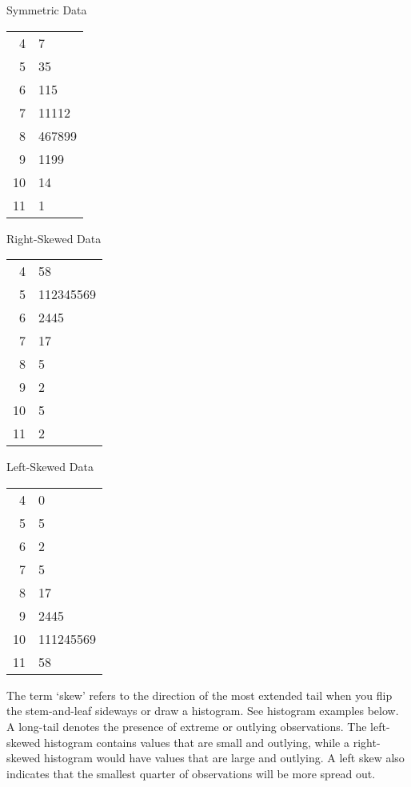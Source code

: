 \documentclass[11pt]{book}\usepackage[]{graphicx}\usepackage[]{color}
\begin{document}
\begin{minipage}[ht]{4.5cm}

Symmetric Data



\begin{tabular}{@{} r|l @{}} \hline
4 & 7 \\
5 & 35 \\
6 & 115 \\
7 & 11112 \\
8 & 467899 \\
9 & 1199 \\
10 & 14 \\
11 & 1 \\ \hline
\end{tabular}
\end{minipage}
\begin{minipage}[ht]{4.5cm}

Right-Skewed Data



\begin{tabular}{@{} r|l @{}} \hline
4 & 58 \\
5 & 112345569 \\
6 & 2445 \\
7 & 17 \\
8 & 5 \\
9 & 2 \\
10 & 5 \\
11 & 2 \\ \hline
\end{tabular}
\end{minipage}
\begin{minipage}[ht]{4.5cm}

Left-Skewed Data




\begin{tabular}{@{} r|l} \hline
4 & 0 \\
5 & 5 \\
6 & 2 \\
7 & 5\\
8 & 17 \\
9 & 2445 \\
10 & 111245569 \\
11 & 58 \\ \hline
\end{tabular}
\end{minipage}

\vspace{1cm}

The term `skew' refers to the direction of the most extended tail when you flip the stem-and-leaf sideways or draw a histogram. See histogram examples below. A long-tail denotes the presence of extreme or outlying observations.  The left-skewed histogram contains values that are small and outlying, while a right-skewed histogram would have values that are large and outlying.  A left skew also indicates that the smallest quarter of observations will be more spread out.
\end{document}
